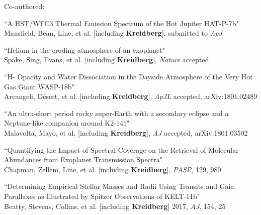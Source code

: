\documentclass[12pt,letterpaper]{article}
\begin{document}
\vspace{3mm}
\hspace*{5mm}Co-authored:
\begin{compactenum}


\item ``A HST/WFC3 Thermal Emission Spectrum of the Hot Jupiter HAT-P-7b"\\
Mansfield, Bean, Line, et al. [including \textbf{Kreidberg}], submitted to \textit{ApJ}

\item ``Helium in the eroding atmosphere of an exoplanet"\\
	Spake, Sing, Evans, et al. [including \textbf{Kreidberg}], \textit{Nature} accepted

\item ``H- Opacity and Water Dissociation in the Dayside Atmosphere of the Very Hot Gas Giant WASP-18b"\\
	Arcangeli, D\'{e}sert, et al. [including \textbf{Kreidberg}], \textit{ApJL} accepted, arXiv:1801.02489

\item ``An ultra-short period rocky super-Earth with a secondary eclipse and a Neptune-like companion around K2-141"\\
Malavolta, Mayo, et al. [including \textbf{Kreidberg}], \textit{AJ} accepted, arXiv:1801.03502

\item ``Quantifying the Impact of Spectral Coverage on the Retrieval of Molecular Abundances from Exoplanet Transmission Spectra"\\
Chapman, Zellem, Line, et al. [including \textbf{Kreidberg}], \textit{PASP}, 129, 980

\item ``Determining Empirical Stellar Masses and Radii Using Transits and Gaia Parallaxes as Illustrated by Spitzer Observations of KELT-11b"\\
Beatty, Stevens, Collins, et al. [including \textbf{Kreidberg}] 2017, \textit{AJ}, 154, 25 


\end{compactenum}
\end{document}
